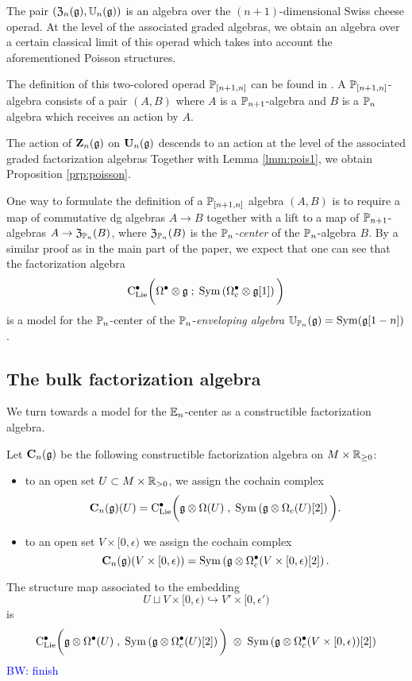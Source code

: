 \documentclass[11pt]{amsart}
\numberwithin{equation}{section}
\def\brian{\textcolor{blue}{BW: }\textcolor{blue}}
\begin{document}
The pair $(\mathfrak Z_n(\mathfrak g), \mathbb U_n(\mathfrak g))$ is an algebra over the $(n+1)$-dimensional Swiss cheese operad. 
At the level of the associated graded algebras, we obtain an algebra over a certain classical limit of this operad which takes into account the aforementioned Poisson structures.

The definition of this two-colored operad $\mathbb P_{[n+1,n]}$ can be found in \cite{SafronovCoiso}. 
A $\mathbb P_{[n+1,n]}$-algebra consists of a pair $(A,B)$ where $A$ is a $\mathbb P_{n+1}$-algebra and $B$ is a $\mathbb P_n$ algebra which receives an action by $A$. 

The action of $\mathbf Z_n(\mathfrak g)$ on $\mathbf U_n(\mathfrak g)$ descends to an action at the level of the associated graded factorization algebras
Together with Lemma \ref{lmm:pois1}, we obtain Proposition \ref{prp:poisson}. 

\begin{rmk}
One way to formulate the definition of a $\mathbb P_{[n+1,n]}$ algebra $(A,B)$ is to require a map of commutative dg algebras $A \to B$ together with a lift to a map of $\mathbb P_{n+1}$-algebras $A \to \mathfrak Z_{\mathbb P_n} (B)$, where $\mathfrak Z_{\mathbb P_n}(B)$ is the {\em $\mathbb P_n$-center} of the $\mathbb P_n$-algebra $B$. 
By a similar proof as in the main part of the paper, we expect that one can see that the factorization algebra
\[
{\rm C}_{\rm Lie}^\bullet \bigg(\Omega^\bullet \otimes \mathfrak g \; ; \; {\rm Sym} \left(\Omega^\bullet_c \otimes \mathfrak g [1] \right) \bigg)
\]
is a model for the $\mathbb P_n$-center of the $\mathbb P_n$-{\em enveloping algebra} $\mathbb U_{\mathbb P_n} (\mathfrak g) = {\rm Sym} (\mathfrak g [1-n])$. 
\end{rmk}

\subsection{The bulk factorization algebra} \label{sec:bulk}

We turn towards a model for the $\mathbb E_n$-center as a constructible factorization algebra. 

\begin{dfn}
\label{dfn:constructible1}
Let $\mathbf C_n(\mathfrak g)$ be the following constructible factorization algebra on $M \times \mathbb R_{\geq 0}$:
\begin{itemize}
\item to an open set $U \subset M \times \mathbb R_{> 0}$, we assign the cochain complex 
\[
\mathbf C_n (\mathfrak g) (U) = {\rm C}_{\rm Lie}^\bullet \bigg(\mathfrak g \otimes \Omega (U) \; , \; {\rm Sym} \left(\mathfrak g \otimes \Omega_c(U) [2] \right) \bigg) .
\]
\item to an open set $V \times [0,\epsilon)$ we assign the cochain complex 
\[
\mathbf C_n (\mathfrak g) (V \times [0,\epsilon)) = {\rm Sym} \left(\mathfrak g \otimes \Omega^\bullet_c (V \times [0,\epsilon) [2] \right).
\]
\end{itemize}
The structure map associated to the embedding 
\[
U \sqcup V \times [0, \epsilon) \hookrightarrow V' \times [0,\epsilon')
\]
is
\[
{\rm C}_{\rm Lie}^\bullet \bigg(\mathfrak g \otimes \Omega^\bullet (U) \; , \; {\rm Sym} \left(\mathfrak g \otimes \Omega^\bullet_c(U) [2] \right) \bigg) \; \otimes \;  {\rm Sym} \left(\mathfrak g \otimes \Omega^\bullet_c (V\times [0,\epsilon)) [2] \right) 
\]
\brian{finish}
\end{dfn}
\end{document}
